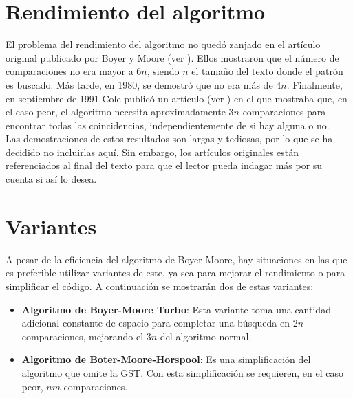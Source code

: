 
\section{Rendimiento del algoritmo}
El problema del rendimiento del algoritmo no quedó zanjado en el artículo original publicado por Boyer y Moore (ver \cite{articulo1}). Ellos mostraron que el número de comparaciones no era mayor a $6n$, siendo $n$ el tamaño del texto donde el patrón es buscado. Más tarde, en 1980, se demostró que no era más de $4n$. Finalmente, en septiembre de 1991 Cole publicó un artículo (ver \cite{articulo2}) en el que mostraba que, en el caso peor, el algoritmo necesita aproximadamente $3n$ comparaciones  para encontrar todas las coincidencias, independientemente de si hay alguna o no. \\

Las demostraciones de estos resultados son largas y tediosas, por lo que se ha decidido no incluirlas aquí. Sin embargo, los artículos originales están referenciados al final del texto para que el lector pueda indagar más por su cuenta si así lo desea.

\section{Variantes}
A pesar de la eficiencia del algoritmo de Boyer-Moore, hay situaciones en las que es preferible utilizar variantes de este, ya sea para mejorar el rendimiento o para simplificar el código. A continuación se mostrarán dos de estas variantes:\\

\begin{itemize}
	\item \textbf{Algoritmo de Boyer-Moore Turbo}: Esta variante toma una cantidad adicional constante de espacio para completar una búsqueda en $2n$ comparaciones, mejorando el $3n$ del algoritmo normal.
	\item \textbf{Algoritmo de Boter-Moore-Horspool}: Es una simplificación del algoritmo que omite la GST. Con esta simplificación se requieren, en el caso peor, $nm$ comparaciones.
\end{itemize}